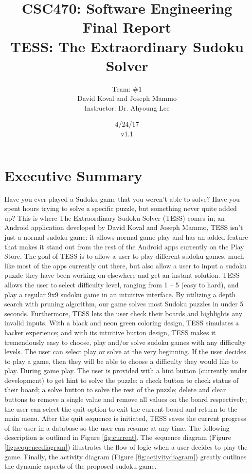 \documentclass{article}
\title{CSC470: Software Engineering Final Report\\ TESS: The Extraordinary Sudoku Solver}
\author{Team: \#1 \\David Koval and Joseph Mammo\\Instructor: Dr. Ahyoung Lee}
\date{ 4/24/17 \\ v1.1 }
\begin{document}
 
\maketitle

\clearpage

\tableofcontents

\clearpage

\section{Executive Summary} 

Have you ever played a Sudoku game that you weren’t able to solve? Have you spent hours trying to solve a specific puzzle, but something never quite added up? This is where The Extraordinary Sudoku Solver (TESS) comes in; an Android application developed by David Koval and Joseph Mammo, TESS isn’t just a normal sudoku game: it allows normal game play and has an added feature that makes it stand out from the rest of the Android apps currently on the Play Store. \newline \newline
The goal of TESS is to allow a user to play different sudoku games, much like most of the apps currently out there, but also allow a user to input a sudoku puzzle they have been working on elsewhere and get an instant solution. TESS allows the user to select difficulty level, ranging from 1 – 5 (easy to hard), and play a regular 9x9 sudoku game in an intuitive interface. By utilizing a depth search with pruning algorithm, our game solves most Sudoku puzzles in under 5 seconds. Furthermore, TESS lets the user check their boards and highlights any invalid inputs.\newline \newline
With a black and neon green coloring design, TESS simulates a hacker experience; and with its intuitive button design, TESS makes it tremendously easy to choose, play and/or solve sudoku games with any difficulty levels. The user can select play or solve at the very beginning. If the user decides to play a game, then they will be able to choose a difficulty they would like to play. During game play. The user is provided with a hint button (currently under development) to get hint to solve the puzzle; a check button to check status of their board; a solve button to solve the rest of the puzzle; delete and clear buttons to remove a single value and remove all values on the board respectively; the user can select the quit option to exit the current board and return to the main menu. After the quit sequence is initiated, TESS saves the current progress of the user in a database so the user can resume at any time. The following description is outlined in Figure \ref{fig:current}. The sequence diagram (Figure \ref{fig:sequencediagram}) illustrates the flow of logic when a user decides to play the game. Finally, the activity diagram (Figure \ref{fig:activitydiagram}) greatly outlines the dynamic aspects of the proposed sudoku game.  \newline \newline
\end{document}
